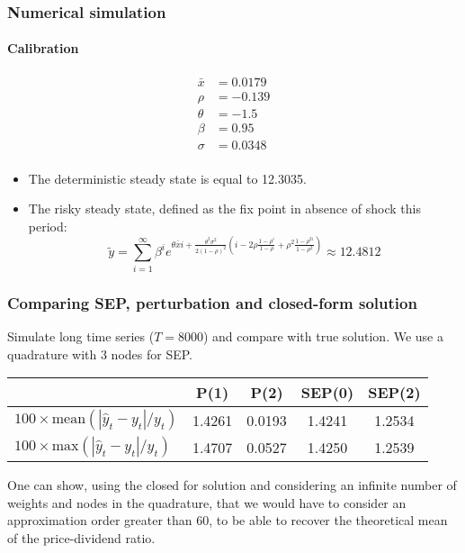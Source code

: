 \documentclass{beamer}
\begin{document}
\begin{frame}
  \frametitle{Numerical simulation}
   \framesubtitle{Calibration}

\begin{align*}
  \bar x &= 0.0179\\
  \rho &=  -0.139\\
  \theta &= -1.5\\
  \beta &= 0.95\\
  \sigma &= 0.0348\\
\end{align*}

\medskip

\begin{itemize}
\item The deterministic steady state is equal to 12.3035.\newline
\item The risky steady state, defined as the fix point in absence of
  shock this period:
\[
\widetilde y = \sum_{i=1}^\infty \beta^i e^{\theta \bar x i +
\frac{\theta^2\sigma^2}{2(1-\rho)^2}\left(i-2\rho\frac{1-\rho^i}{1-\rho}+\rho^2\frac{1-\rho^{2i}}{1-\rho^2}\right)}\approx 12.4812
\]

\end{itemize}

\end{frame}

\begin{frame}
\frametitle{Comparing SEP, perturbation and closed-form solution}

Simulate long time series ($T=8000$) and compare with true solution. We use a quadrature with 3 nodes for SEP.\newline

\bigskip

\begin{tabular}{l|cc|cc}
  \hline
  & P(1) & P(2) & SEP(0) & SEP(2)\\ \hline
  $100\times\textrm{mean}(|\hat y_t - y_t|/y_t)$  & 1.4261 &  0.0193 & 1.4241 &  1.2534\\
  $100\times\textrm{max}(|\hat y_t - y_t|/y_t)$   & 1.4707 &  0.0527 & 1.4250 &  1.2539\\ \hline\hline
\end{tabular}

\bigskip\bigskip

One can show, using the closed for solution and considering an infinite number of weights and nodes in the quadrature, that we would have to consider an approximation order greater than 60, to be able to recover the theoretical mean of the price-dividend ratio.


\end{frame}
\end{document}
